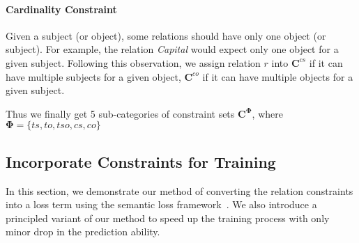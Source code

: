 
\paragraph{Cardinality Constraint}
Given a subject (or object), some relations should have only one object (or subject).
For example, the relation \emph{Capital} would expect only one object for a given subject.
Following this observation, we assign relation $r$ into $\bm{C}^{cs}$ if it can have multiple subjects for a given object, $\bm{C}^{co}$ if it can have multiple objects for a given subject.



Thus we finally get 5 sub-categories of constraint sets $\bm{C^{\Phi}}$, where $\bm{\Phi}=\{ts, to, tso, cs, co\}$

\subsection{Incorporate  Constraints for Training}
\label{sec:loss_term}
In this section, we demonstrate our method of converting the relation constraints into a loss term using the semantic loss framework~\cite{xu2017semantic}.
We also introduce a principled variant of our method to speed up the training process with only minor drop in the prediction ability.

